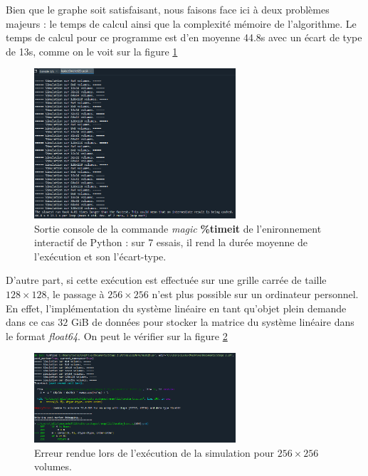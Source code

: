 Bien que le graphe soit satisfaisant, nous faisons face ici à deux problèmes majeurs : le temps de calcul ainsi que la complexité mémoire de l'algorithme. Le temps de calcul pour ce programme est d'en moyenne 44.8s avec un écart de type de 13s, comme on le voit sur la figure \ref{fig:laplacienDirichlet2Dtemps}
\begin{figure}[htp]
    \centering
    \includegraphics[width=7.5cm]{Images/preliminaires/Laplace Dirichlet 2D/temps.png}
    \caption{Sortie console de la commande \textit{magic} \textbf{\%timeit} de l'enironnement interactif de Python : sur 7 essais, il rend la durée moyenne de l'exécution et son l'écart-type.}
    \label{fig:laplacienDirichlet2Dtemps}
\end{figure}

D'autre part, si cette exécution est effectuée sur une grille carrée de taille $128 \times 128$, le passage à $256 \times 256$ n'est plus possible sur un ordinateur personnel. En effet, l'implémentation du système linéaire en tant qu'objet plein demande dans ce cas $32$ GiB de données pour stocker la matrice du système linéaire dans le format \textit{float64}. On peut le vérifier sur la figure \ref{fig:laplacienDirichlet2Dmemoire}
\begin{figure}[htp]
    \centering
    \includegraphics[width=7.5cm]{Images/preliminaires/Laplace Dirichlet 2D/memoire.png}
    \caption{Erreur rendue lors de l'exécution de la simulation pour $256 \times 256$ volumes.}
    \label{fig:laplacienDirichlet2Dmemoire}
\end{figure}

\newpage

